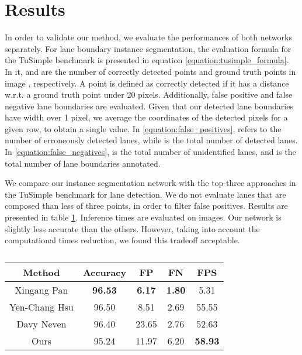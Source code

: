\documentclass[runningheads]{llncs}
\begin{document}
\section{Results}
In order to validate our method, we evaluate the performances of both networks separately. For lane boundary instance segmentation, the evaluation formula for the TuSimple benchmark is presented in equation \ref{equation:tusimple_formula}. In it,  and  are the number of correctly detected points and ground truth points in image , respectively. A point is defined as correctly detected if it has a distance w.r.t. a ground truth point under 20 pixels. Additionally, false positive and false negative lane boundaries are evaluated. Given that our detected lane boundaries have width over 1 pixel, we average the  coordinates of the detected pixels for a given row, to obtain a single value. In \ref{equation:false_positives},  refers to the number of erroneously detected lanes, while  is the total number of detected lanes. In \ref{equation:false_negatives},  is the total number of unidentified lanes, and  is the total number of lane boundaries annotated.

\begin{multicols}{3}
\break
\break

\end{multicols}

We compare our instance segmentation network with the top-three approaches in the TuSimple benchmark for lane detection. We do not evaluate lanes that are composed than less of three points, in order to filter false positives. Results are presented in table \ref{table:inst_metric}. Inference times are evaluated on  images. Our network is slightly less accurate than the others. However, taking into account the computational times reduction, we found this tradeoff acceptable.

\begin{table}
  \caption{}
  \label{table:inst_metric}
  \setlength{\tabcolsep}{4\tabcolsep}\centering

  \begin{tabular}{ *{5}{c} }
    \toprule
    \textbf{Method} & \textbf{Accuracy} &  \textbf{FP} & \textbf{FN} & \textbf{FPS} \\
    \midrule
    Xingang Pan \cite{pan2018spatial} & \textbf{96.53} & \textbf{6.17} & \textbf{1.80} & 5.31\\
    Yen-Chang Hsu \cite{hsu2018}  & 96.50 & 8.51 & 2.69 & 55.55\\
    Davy Neven \cite{neven2018towards} & 96.40 & 23.65 & 2.76 & 52.63\\
    Ours & 95.24 & 11.97 & 6.20 & \textbf{58.93}\\
    \bottomrule
  \end{tabular}
  \vspace{1pt}
\end{table}
\end{document}
